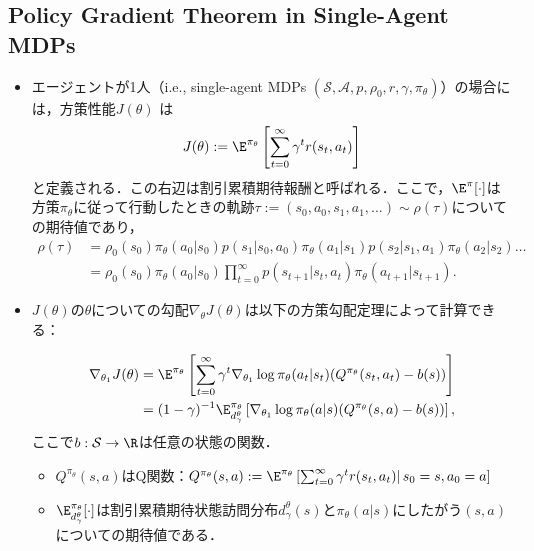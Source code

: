 \documentclass[a4paper,10pt,dvipdfmx]{jsarticle}
\begin{document}
\subsection{Policy Gradient Theorem in Single-Agent MDPs}

\begin{itemize}
    \item エージェントが1人（i.e., single-agent MDPs $(\mathcal{S}, \mathcal{A}, p, \rho_0, r, \gamma,\pi_{\theta})$）の場合には，方策性能$J(\theta)$ は
    \begin{align}
        J(\theta):=\E^{\pi_{\theta}}\left[\sum_{t=0}^\infty\gamma^tr(s_t,a_t)\right]
    \end{align}
    と定義される．この右辺は割引累積期待報酬と呼ばれる．ここで，$\E^{\pi}[\cdot]$は方策$\pi_{\theta}$に従って行動したときの軌跡$\tau:=(s_0,a_0,s_1,a_1,...)\sim \rho(\tau)$についての期待値であり，
    \begin{subequations}
    \begin{align}
        \rho(\tau)&=\rho_0(s_0)\pi_{\theta}(a_0|s_0)p(s_1|s_0,a_0)\pi_{\theta}(a_1|s_1)p(s_2|s_1,a_1)\pi_{\theta}(a_2|s_2)\dots\\
        &=\rho_0(s_0)\pi_{\theta}(a_0|s_0)\prod_{t=0}^\infty p(s_{t+1}|s_t,a_t)\pi_{\theta}(a_{t+1}|s_{t+1}).
    \end{align}
    \end{subequations}
    \item $J(\theta)$の$\theta$についての勾配$\nabla_{\theta}J(\theta)$は以下の方策勾配定理によって計算できる：
    \begin{theorem}\label{thrm:PGT}
        \begin{align}
            \nabla_{\theta_1}J(\theta)&=\E^{\pi_{\theta}}\left[\sum_{t=0}^\infty\gamma^t\nabla_{\theta_1}\log \pi_{\theta}(a_t|s_t)(Q^{\pi_{\theta}}(s_t,a_t)-b(s))\right]\\
            &=(1-\gamma)^{-1}\E_{d_{\gamma}^{\theta}}^{\pi_{\theta}}\left[\nabla_{\theta_1}\log \pi_{\theta}(a|s)(Q^{\pi_{\theta}}(s,a)-b(s))\right],
        \end{align}
        ここで$b:\mathcal{S}\to\R$は任意の状態の関数．
    \end{theorem}
    \begin{itemize}
        \item $Q^{\pi_{\theta}}(s,a)$はQ関数：$Q^{\pi_{\theta}}(s,a):=\E^{\pi_{\theta}}\left[\sum_{t=0}^\infty\gamma^tr(s_t,a_t)\right|s_0=s,a_0=a]$
        \item $\E_{d_{\gamma}^{\theta}}^{\pi_{\theta}}[\cdot]$は割引累積期待状態訪問分布$d_{\gamma}^{\theta}(s)$と$\pi_{\theta}(a|s)$にしたがう$(s,a)$についての期待値である．

\end{itemize}
\end{itemize}
\end{document}
